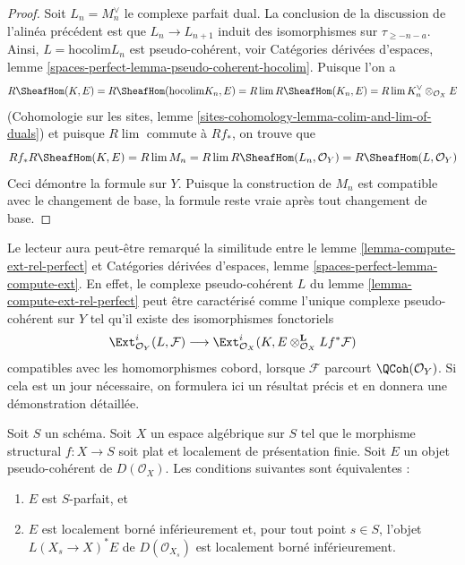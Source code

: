 \begin{proof}
\medskip\noindent
Soit $L_n = M_n^\vee$ le complexe parfait dual. La
conclusion de la discussion de l'alinéa précédent est que
$L_n \to L_{n + 1}$ induit des isomorphismes sur $\tau_{\geq -n - a}$.
Ainsi, $L = \text{hocolim} L_n$ est pseudo-cohérent, voir
Catégories dérivées d'espaces, lemme
\ref{spaces-perfect-lemma-pseudo-coherent-hocolim}.
Puisque l'on a
$$
R\SheafHom(K, E) = R\SheafHom(\text{hocolim} K_n, E) =
R\lim R\SheafHom(K_n, E) = R\lim K_n^\vee \otimes_{\mathcal{O}_X} E
$$
(Cohomologie sur les sites, lemme
\ref{sites-cohomology-lemma-colim-and-lim-of-duals})
et puisque $R\lim$ commute à $Rf_*$, on trouve que
$$
Rf_*R\SheafHom(K, E) = R\lim M_n = R\lim R\SheafHom(L_n, \mathcal{O}_Y) =
R\SheafHom(L, \mathcal{O}_Y)
$$
Ceci démontre la formule sur $Y$. Puisque la construction de $M_n$ est
compatible avec le changement de base, la formule reste vraie après
tout changement de base.
\end{proof}

\begin{remark}
\label{remark-compare-L}
Le lecteur aura peut-être remarqué la similitude entre le
lemme \ref{lemma-compute-ext-rel-perfect} et
Catégories dérivées d'espaces, lemme \ref{spaces-perfect-lemma-compute-ext}.
En effet, le complexe pseudo-cohérent $L$ du
lemme \ref{lemma-compute-ext-rel-perfect}
peut être caractérisé comme l'unique complexe pseudo-cohérent
sur $Y$ tel qu'il existe des isomorphismes fonctoriels
$$
\Ext^i_{\mathcal{O}_Y}(L, \mathcal{F}) \longrightarrow
\Ext^i_{\mathcal{O}_X}(K,
E \otimes_{\mathcal{O}_X}^\mathbf{L} Lf^*\mathcal{F})
$$
compatibles avec les homomorphismes cobord, lorsque $\mathcal{F}$ parcourt
$\QCoh(\mathcal{O}_Y)$. Si cela est un jour nécessaire, on
formulera ici un résultat précis et en donnera une démonstration détaillée.
\end{remark}

\begin{lemma}
\label{lemma-bounded-on-fibres}
Soit $S$ un schéma. Soit $X$ un espace algébrique sur $S$ tel que
le morphisme structural $f : X \to S$ soit plat et
localement de présentation finie. Soit $E$ un objet pseudo-cohérent
de $D(\mathcal{O}_X)$. Les conditions suivantes sont équivalentes :
\begin{enumerate}
\item $E$ est $S$-parfait, et
\item $E$ est localement borné inférieurement et, pour tout point $s \in S$,
l'objet $L(X_s \to X)^*E$ de $D(\mathcal{O}_{X_s})$
est localement borné inférieurement.
\end{enumerate}
\end{lemma}

